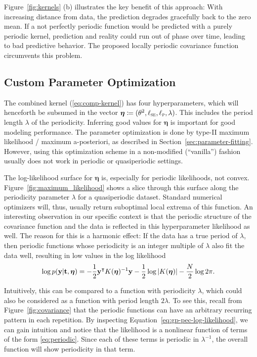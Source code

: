 Figure~\ref{fig:kernels} (b) illustrates the key benefit of this approach: With
increasing distance from data, the prediction degrades gracefully back to the
zero mean. If a not perfectly periodic function would be predicted with a
purely periodic kernel, prediction and reality could run out of phase over
time, leading to bad predictive behavior. The proposed locally periodic
covariance function circumvents this problem.

\subsection{Custom Parameter Optimization}
\label{sec:custom-optimisation}

The combined kernel (\ref{eq:comp-kernel}) has four hyperparameters,
which will henceforth be subsumed in the vector $\boldsymbol{\eta}
\coloneqq
(\theta^2,\ell_{\normalfont\textsc{se}},\ell_{\normalfont\textsc{p}},\lambda)$. This includes the
period length $\lambda$ of the periodicity. Inferring good values for
$\boldsymbol{\eta}$ is
important for good modeling performance. The parameter optimization is done
by type-II maximum likelihood / maximum a-posteriori, as described in
Section~\ref{sec:parameter-fitting}. However, using this optimization scheme in
a non-modified (``vanilla'') fashion usually does not work in periodic or
quasiperiodic settings.

The log-likelihood surface for $\boldsymbol{\eta}$ is, especially
for periodic likelihoods,
not convex. Figure~\ref{fig:maximum_likelihood} shows a slice through this
surface along the periodicity parameter $\lambda$ for a quasiperiodic dataset.
Standard numerical optimizers will, thus, usually return suboptimal local
extrema of this function. An interesting observation in our specific context is
that the periodic structure of the covariance function and the data is reflected
in this hyperparameter likelihood as well. The reason for this is a harmonic
effect: If the data has a true period of $\lambda$, then periodic functions
whose periodicity is an integer multiple of $\lambda$ also fit the data well,
resulting in low values in the log likelihood
\begin{equation}
\label{eq:gp-pec-log-likelihood}
  \log p(\mathbf{y} | \mathbf{t},\boldsymbol{\eta}) = - \frac{1}{2} \mathbf{y}\T
K(\boldsymbol{\eta})\inv
  \mathbf{y} - \frac{1}{2} \log \left|K(\boldsymbol{\eta})\right| -\frac{N}{2}
\log 2\pi.
\end{equation}

Intuitively, this can be compared to a function with periodicity $\lambda$,
which could also be considered as a function with period length $2\lambda$. To
see this, recall from Figure~\ref{fig:covariance} that the periodic
functions can have an arbitrary recurring pattern in each repetition. By
inspecting Equation~\eqref{eq:gp-pec-log-likelihood}, we can gain intuition and
notice that the likelihood is a nonlinear function of terms of the form
\eqref{eq:periodic}. Since each of these terms is periodic in $\lambda^{-1}$,
the overall function will show periodicity in that term.

